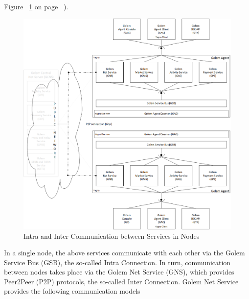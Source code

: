 
Figure ~\ref{fig:SCR} on page ~\pageref{fig:SCR}).

\begin{figure}[htbp]
    \centering
    \includegraphics[width=12cm,angle=0]{./diag/Reference/ServicesConcept-Reference.png}
	\caption{Intra and Inter Communication between Services in Nodes}
    \label{fig:SCR}
\end{figure}


In a single node, the above services communicate with each other via the Golem Service Bus (GSB), the so-called Intra Connection.
In turn, communication between nodes takes place via the Golem Net Service (GNS), which provides Peer2Peer (P2P) protocols, the so-called Inter Connection.
Golem Net Service provides the following communication models

